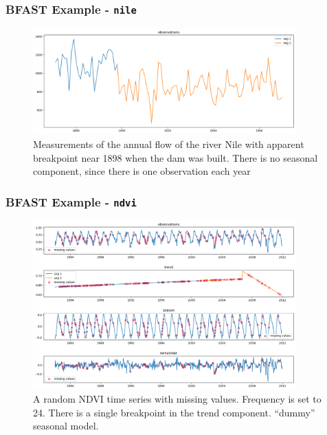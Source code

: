 \documentclass[presentation.tex]{subfiles}
\begin{document}
\begin{frame}
\frametitle{BFAST Example - \texttt{nile}}
\begin{figure}[H]
  \centering
  \includegraphics[width=0.9\textwidth]{imgs/nile.png}
  \caption{Measurements of the annual flow of the river Nile with apparent
    breakpoint near 1898 when the dam was built. There is no seasonal
    component, since there is one observation each year}
\end{figure}
\end{frame}


\begin{frame}
\frametitle{BFAST Example - \texttt{ndvi}}
\begin{figure}[H]
  \centering
  \includegraphics[width=0.9\textwidth]{imgs/ndvi.png}
  \caption{A random NDVI time series with missing values. Frequency is set to 24.
    There is a single breakpoint in the trend component. ``dummy'' seasonal model.}
\end{figure}
\end{frame}
\end{document}

